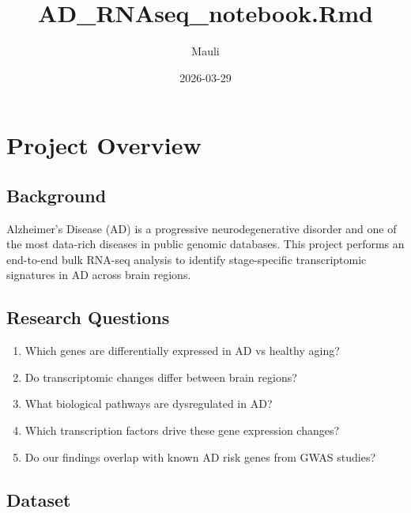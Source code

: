 \documentclass[
]{article}
\title{AD\_RNAseq\_notebook.Rmd}
\author{Mauli}
\date{2026-03-29}
\providecommand{\tightlist}{%
  \setlength{\itemsep}{0pt}\setlength{\parskip}{0pt}}
\begin{document}
\maketitle

\section{Project Overview}\label{project-overview}

\subsection{Background}\label{background}

Alzheimer's Disease (AD) is a progressive neurodegenerative disorder and
one of the most data-rich diseases in public genomic databases. This
project performs an end-to-end bulk RNA-seq analysis to identify
stage-specific transcriptomic signatures in AD across brain regions.

\subsection{Research Questions}\label{research-questions}

\begin{enumerate}
\def\labelenumi{\arabic{enumi}.}
\tightlist
\item
  Which genes are differentially expressed in AD vs healthy aging?
\item
  Do transcriptomic changes differ between brain regions?
\item
  What biological pathways are dysregulated in AD?
\item
  Which transcription factors drive these gene expression changes?
\item
  Do our findings overlap with known AD risk genes from GWAS studies?
\end{enumerate}

\subsection{Dataset}\label{dataset}
\end{document}

